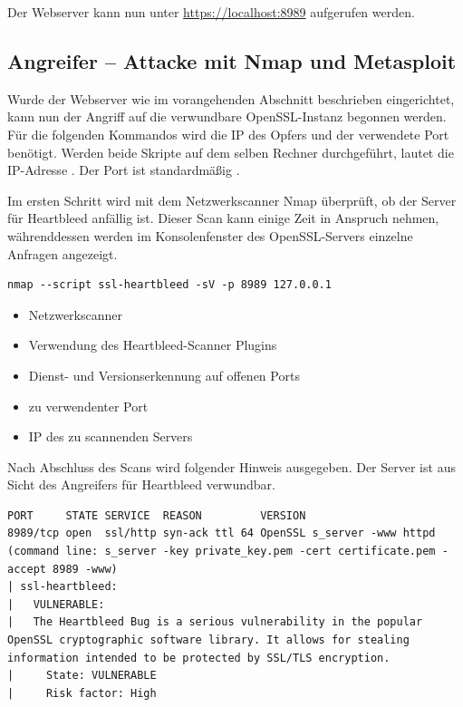 Der Webserver kann nun unter \url{https://localhost:8989} aufgerufen werden.

\subsection{Angreifer -- Attacke mit Nmap und Metasploit}
Wurde der Webserver wie im vorangehenden Abschnitt beschrieben eingerichtet, kann nun der Angriff auf die verwundbare OpenSSL-Instanz begonnen werden. Für die folgenden Kommandos wird die IP des Opfers und der verwendete Port benötigt. Werden beide Skripte auf dem selben Rechner durchgeführt, lautet die IP-Adresse . Der Port ist standardmäßig .

Im ersten Schritt wird mit dem Netzwerkscanner Nmap überprüft, ob der Server für Heartbleed anfällig ist. Dieser Scan kann einige Zeit in Anspruch nehmen, währenddessen werden im Konsolenfenster des OpenSSL-Servers einzelne Anfragen angezeigt.

\begin{lstlisting}
nmap --script ssl-heartbleed -sV -p 8989 127.0.0.1
\end{lstlisting}

\begin{itemize}
	\item {} Netzwerkscanner
	\item {} Verwendung des Heartbleed-Scanner Plugins
	\item {} Dienst- und Versionserkennung auf offenen Ports
	\item {} zu verwendenter Port
	\item {} IP des zu scannenden Servers
\end{itemize}

Nach Abschluss des Scans wird folgender Hinweis ausgegeben. Der Server ist aus Sicht des Angreifers für Heartbleed verwundbar.

\begin{lstlisting}[caption={Nmap Ausgabe zu verwundbaren SSL-Dienst},label=lst:nmap_heartbleed]
PORT     STATE SERVICE  REASON         VERSION
8989/tcp open  ssl/http syn-ack ttl 64 OpenSSL s_server -www httpd (command line: s_server -key private_key.pem -cert certificate.pem -accept 8989 -www)
| ssl-heartbleed:
|   VULNERABLE:
|   The Heartbleed Bug is a serious vulnerability in the popular OpenSSL cryptographic software library. It allows for stealing information intended to be protected by SSL/TLS encryption.
|     State: VULNERABLE
|     Risk factor: High
\end{lstlisting}

